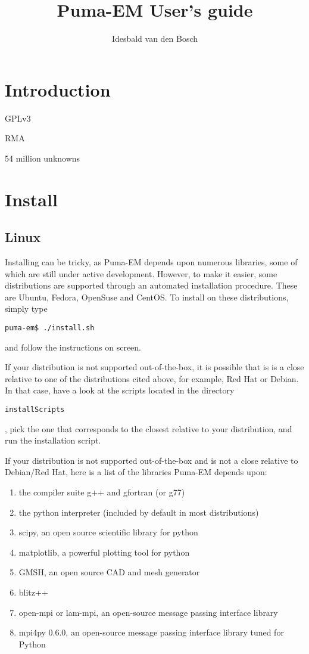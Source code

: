 \documentclass[a4paper,10pt]{book}
\title{Puma-EM User's guide}
\author{Idesbald van den Bosch}
\begin{document}
\maketitle
\tableofcontents

\chapter{Introduction}
GPLv3

RMA

54 million unknowns


\chapter{Install}

\section{Linux}
\par
Installing can be tricky, as Puma-EM depends upon numerous libraries, some of which are still under active development. However, to make it easier, some distributions are supported through an automated installation procedure. These are Ubuntu, Fedora, OpenSuse and CentOS. To install on these distributions, simply type 
\begin{verbatim}
puma-em$ ./install.sh
\end{verbatim}
and follow the instructions on screen.

\par
If your distribution is not supported out-of-the-box, it is possible that is is a close relative to one of the distributions cited above, for example, Red Hat or Debian. In that case, have a look at the scripts located in the directory \begin{verbatim}installScripts\end{verbatim}, pick the one that corresponds to the closest relative to your distribution, and run the installation script.

\par
If your distribution is not supported out-of-the-box and is not a close relative to Debian/Red Hat, here is a list of the libraries Puma-EM depends upon:
\begin{enumerate}
\item the compiler suite g++ and gfortran (or g77)
\item the python interpreter (included by default in most distributions)
\item scipy, an open source scientific library for python
\item matplotlib, a powerful plotting tool for python
\item GMSH, an open source CAD and mesh generator
\item blitz++
\item open-mpi or lam-mpi, an open-source message passing interface library
\item mpi4py 0.6.0, an open-source message passing interface library tuned for Python
\end{enumerate}
\end{document}
